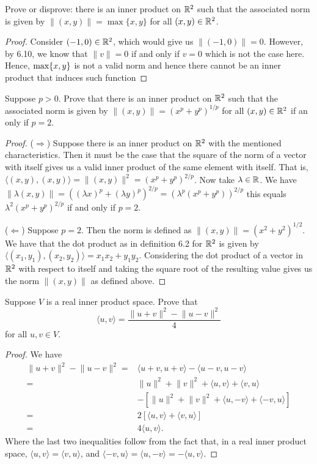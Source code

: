 \begin{exercise}{17}
  Prove or disprove: there is an inner product on $\mathbb{R}^2$ such that the associated norm is given by $\lVert (x,y)\rVert=\max\{x,y\}$ for all $(x,y)\in\mathbb{R}^2$.
\end{exercise}
\begin{proof}
 Consider $(-1,0)\in\mathbb{R}^2$, which would give us $\lVert (-1,0)\rVert=0$. However, by 6.10, we know that $\lVert v\rVert=0$ if and only if $v=0$ which is not the case here. Hence, $\max\{x,y\}$ is not a valid norm and hence there cannot be an inner product that induces such function
\end{proof}

\begin{exercise}{18}
  Suppose $p>0$. Prove that there is an inner product on $\mathbb{R}^2$ such that the associated norm is given by $\lVert (x,y)\rVert =(x^p+y^p)^{1/p}$ for all $(x,y)\in\mathbb{R}^2$ if an only if $p=2$.
\end{exercise}
\begin{proof}
 ($\Rightarrow$) Suppose there is an inner product on $\mathbb{R}^2$ with the mentioned characteristics. Then it must be the case that the square  of the norm of a vector with itself gives us a valid inner product of the same element with itself. That is, $\langle (x,y), (x,y)\rangle=\lVert (x,y)\rVert^2= (x^p+y^p)^{2/p}$. Now take $\lambda\in\mathbb{R}$. We have $\lVert\lambda(x,y)\rVert= ((\lambda x)^p+(\lambda y)^p)^{2/p}=(\lambda^p(x^p+y^p))^{2/p}$ this equals $\lambda^2(x^p+y^p)^{2/p}$ if and only if $p=2$.

 ($\Leftarrow$) Suppose $p=2$. Then the norm is defined as $\lVert (x,y)\rVert =(x^2+y^2)^{1/2}$. We have that the dot product as in definition 6.2 for $\mathbb{R}^2$ is given by $\langle (x_1,y_1), (x_2,y_2)\rangle= x_1x_2+y_1y_2$. Considering the dot product of a vector in $\mathbb{R}^2$ with respect to itself and taking the square root of the resulting value gives us the norm $\lVert (x,y)\rVert$ as defined above.
\end{proof}

\begin{exercise}{19}
  Suppose $V$ is a real inner product space. Prove that 
  \[
  \langle u,v\rangle=\frac{\lVert u+v\rVert^2-\lVert u-v\rVert^2}{4}
  \]
  for all $u,v\in V$.
\end{exercise}
\begin{proof}
 We have
 \begin{align*}
     \lVert u+v\rVert^2-\lVert u-v\rVert^2 =& \langle u+v,u+v\rangle - \langle u-v,u-v\rangle\\
     =&\lVert u\rVert^2+\lVert v\rVert^2+\langle u,v\rangle +\langle v,u\rangle\\
     &-[\lVert u\rVert^2+\lVert v\rVert^2+\langle u,-v\rangle+\langle -v,u\rangle]\\
     =& 2[\langle u,v\rangle+\langle v, u\rangle]\\
     =& 4\langle u,v\rangle.
 \end{align*}
Where the last two inequalities follow from the fact that, in a real inner product space, $\langle u,v\rangle=\langle v,u\rangle$, and $\langle -v,u\rangle=\langle u,-v\rangle=-\langle u,v\rangle$.
\end{proof}

